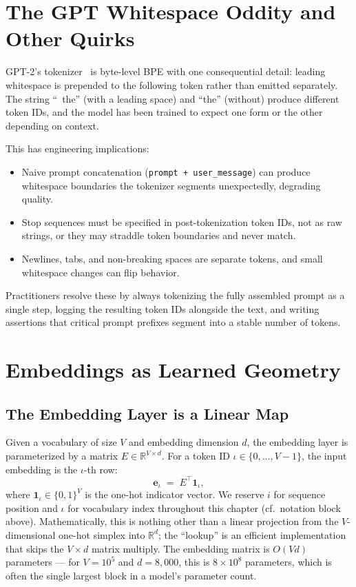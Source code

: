 \section{The GPT Whitespace Oddity and Other Quirks}

GPT-2's tokenizer~\citep{radford2019language,openai_tiktoken} is
byte-level BPE with one consequential detail: leading whitespace is
prepended to the following token rather than emitted separately. The
string ``\ the'' (with a leading space) and ``the'' (without) produce
different token IDs, and the model has been trained to expect one
form or the other depending on context.

This has engineering implications:
\begin{itemize}
  \item Naive prompt concatenation
        (\texttt{prompt + user\_message}) can produce whitespace
        boundaries the tokenizer segments unexpectedly, degrading
        quality.
  \item Stop sequences must be specified in post-tokenization token
        IDs, not as raw strings, or they may straddle token boundaries
        and never match.
  \item Newlines, tabs, and non-breaking spaces are separate tokens,
        and small whitespace changes can flip behavior.
\end{itemize}
Practitioners resolve these by always tokenizing the fully assembled
prompt as a single step, logging the resulting token IDs alongside the
text, and writing assertions that critical prompt prefixes segment
into a stable number of tokens.

\section{Embeddings as Learned Geometry}

\subsection{The Embedding Layer is a Linear Map}

Given a vocabulary of size $V$ and embedding dimension $d$, the
embedding layer is parameterized by a matrix $E \in \mathbb{R}^{V \times d}$.
For a token ID $\iota \in \{0,\dots,V-1\}$, the input embedding is
the $\iota$-th row:
\begin{equation}
\label{eq:ch4-embed}
\mathbf{e}_\iota \;=\; E^{\top} \mathbf{1}_\iota,
\end{equation}
where $\mathbf{1}_\iota \in \{0,1\}^{V}$ is the one-hot indicator vector.
We reserve $i$ for sequence position and $\iota$ for vocabulary
index throughout this chapter (cf.\ notation block above).
Mathematically, this is nothing other than a linear projection from
the $V$-dimensional one-hot simplex into $\mathbb{R}^{d}$; the
``lookup'' is an efficient implementation that skips the $V \times d$
matrix multiply. The embedding matrix is $O(Vd)$ parameters — for
$V = 10^5$ and $d = 8{,}000$, this is $8\times 10^8$ parameters, which
is often the single largest block in a model's parameter count.

